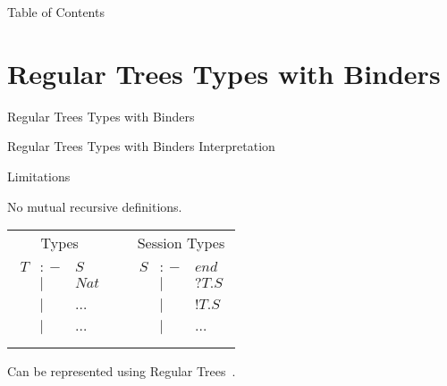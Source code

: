 \documentclass{beamer}
\begin{document}
\begin{frame}{Table of Contents}
  \tableofcontents
\end{frame}


\section{Regular Trees Types with Binders}

\begin{frame}{Regular Trees Types with Binders}


\end{frame}

\begin{frame}{Regular Trees Types with Binders Interpretation}


\end{frame}

\begin{frame}{Limitations}
  
  \begin{block}{}
    No mutual recursive definitions.
  \end{block}
  
  \hspace{5px}

  \begin{center}
    \begin{tabular}{ccc}

    Types && Session Types \\

    $\begin{array}{lcl}
      T &{:\!\!-}& S  \\
      &|&  Nat \\
      &|& \dots \\ 
      &|& \dots \\
      \end{array}$
            &      &
    $\begin{array}{lcl}
      S  &{:\!\!-}& \mathit{end}  \\
      &|& ?T.S    \\
      &|& !T.S    \\
      &|& \dots \\
     \end{array}$ \\

    \end{tabular}
\end{center}

\hspace{5px}

\begin{block}{}
  Can be represented using Regular Trees~\cite{Morris:2004}.
\end{block}

\end{frame}
\end{document}
